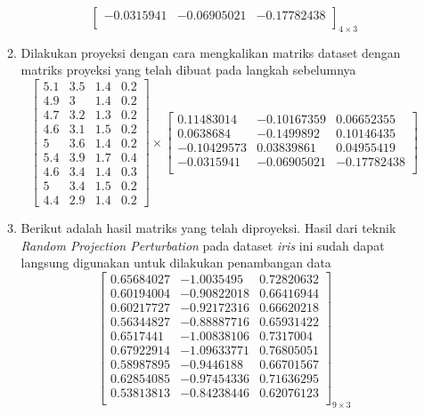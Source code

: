 \documentclass[a4paper,twoside]{article}
\begin{document}
\begin{enumerate}
\begin{enumerate}
\[\begin{bmatrix}
				-0.0315941  &  -0.06905021  & -0.17782438 \\
				\end{bmatrix}_{4\times 3}
			\]
			\item Dilakukan proyeksi dengan cara mengkalikan matriks dataset dengan matriks proyeksi yang telah dibuat pada langkah sebelumnya
			\[
				\begin{bmatrix}
				5.1		&		3.5		&		1.4		&		0.2	\\
				4.9		&		3		&		1.4		&		0.2	\\
				4.7		&		3.2		&		1.3		&		0.2	\\
				4.6		&		3.1		&		1.5		&		0.2	\\
				5		&		3.6		&		1.4		&		0.2	\\
				5.4		&		3.9		&		1.7		&		0.4	\\
				4.6		&		3.4		&		1.4		&		0.3	\\
				5		&		3.4		&		1.5		&		0.2	\\
				4.4		&		2.9		&		1.4		&		0.2 
				\end{bmatrix}
				\times
				\begin{bmatrix}
				0.11483014 &  -0.10167359  &  0.06652355 \\
				0.0638684 &   -0.1499892   &  0.10146435 \\
				-0.10429573 &   0.03839861 &   0.04955419 \\
				-0.0315941  &  -0.06905021  & -0.17782438 \\
				\end{bmatrix}
			\]
			\item Berikut adalah hasil matriks yang telah diproyeksi. Hasil dari teknik \textit{Random Projection Perturbation} pada dataset \textit{iris} ini sudah dapat langsung digunakan untuk dilakukan penambangan data
			\[
				\begin{bmatrix}
				0.65684027 &  -1.0035495   &  0.72820632 \\
				0.60194004 &  -0.90822018  &  0.66416944 \\
				0.60217727  & -0.92172316  &  0.66620218 \\
				0.56344827 &  -0.88887716  &  0.65931422 \\
				0.6517441   & -1.00838106  &  0.7317004  \\
				0.67922914  & -1.09633771  &  0.76805051 \\
				0.58987895  & -0.9446188   &  0.66701567 \\
				0.62854085  & -0.97454336  &  0.71636295 \\
				0.53813813  & -0.84238446  &  0.62076123 \\
				\end{bmatrix}_{9\times 3}
			\]
		\end{enumerate}


\end{enumerate}
\end{document}

